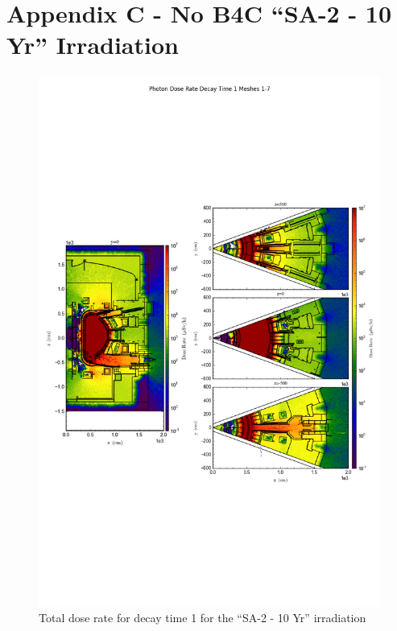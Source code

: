\documentclass[12pt]{article}
\begin{document}
\section{Appendix C - No B4C ``SA-2 - 10 Yr'' Irradiation}
\begin{figure}[ht!]
\centering
\includegraphics[trim={0cm 8cm, 0cm 8cm},clip,scale=0.75]{../plots/final_model/5year/Photon_Dose_Rate_Decay_Time_1_Meshes_1-7.png}
\caption{Total dose rate for decay time 1 for the ``SA-2 - 10 Yr'' irradiation}
\label{fig:photons_5y_dc1_nob4c_dose}
\end{figure}
\end{document}
